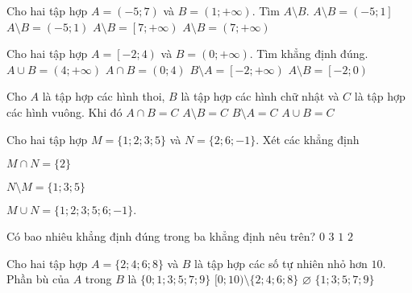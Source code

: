 \begin{ex}%
	Cho hai tập hợp $A = \left(-5;7\right)$ và $B = \left(1;+\infty\right)$. Tìm $A\setminus B$.
	\choice
	{\True $A\setminus B = \left(-5;1\right]$}
	{$A\setminus B = \left(-5;1\right)$}
	{$A\setminus B = \left[7;+\infty\right)$}
	{$A\setminus B = \left(7;+\infty\right)$}
	\loigiai{
		Ta có $A\setminus B = \left(-5;1\right]$.
	}
\end{ex}
\begin{ex}%
	Cho hai tập hợp $A=\left[ -2;4\right)$ và $B=\left(0;+\infty\right)$. Tìm khẳng định đúng.
	\choice
	{$A\cup B=\left(4;+\infty\right)$}
	{\True $A\cap B=\left(0;4\right)$}
	{$B\setminus A=\left[ -2;+\infty\right)$}
	{$A\setminus B=\left[ -2;0\right)$}
	\loigiai{
		$A\cup B=[-2;+\infty) \rightarrow $ loại.\\
		$A\cap B = (0;4) \rightarrow$ chọn.\\
		$B\setminus A = [4;+\infty) \rightarrow$ loại.\\
		$A\setminus B = [-2;0] \rightarrow$ loại.
	}
\end{ex}
\begin{ex}%
	Cho $A$ là tập hợp các hình thoi, $B$ là tập hợp các hình chữ nhật và $C$ là tập hợp các hình vuông. Khi đó
	\choice
	{\True $A\cap B=C $}
	{$A\setminus B=C$}
	{$B\setminus A=C$}
	{$A\cup B=C$}
\end{ex}
\begin{ex}%
	Cho hai tập hợp $M=\{1;2;3;5\}$ và $N=\{2;6;-1\}$. Xét các khẳng định
	\begin{enumEX}[(I)]{3}
		\item $M\cap N=\{2\}$
		\item $N\setminus M=\{1;3;5\}$
		\item $M\cup N=\{1;2;3;5;6;-1\}.$
	\end{enumEX}
	Có bao nhiêu khẳng định đúng trong ba khẳng định nêu trên?
	\choice
	{$0$}
	{$3$}
	{$1$}
	{\True $2$}
\end{ex}
\begin{ex}%
	Cho hai tập hợp $A=\{2;4;6;8\}$ và $B$ là tập hợp các số tự nhiên nhỏ hơn $10$. Phần bù của $A$ trong $B$ là
	\choice
	{\True $\{0;1;3;5;7;9\}$}
	{$[0;10) \setminus \{2;4;6;8\}$}
	{$\varnothing$}
	{$\{1;3;5;7;9\}$}
\end{ex}
